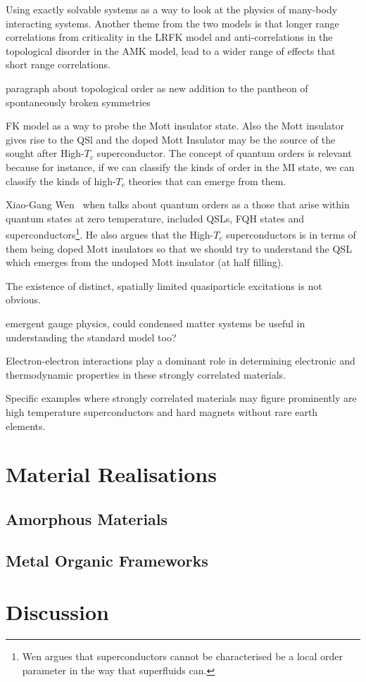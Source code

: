 Using exactly solvable systems as a way to look at the physics of many-body interacting systems. Another theme from the two models is that longer range correlations from criticality in the LRFK model and anti-correlations in the topological disorder in the AMK model, lead to a wider range of effects that short range correlations.

paragraph about topological order as new addition to the pantheon of spontaneously broken symmetries

FK model as a way to probe the Mott insulator state. Also the Mott insulator gives rise to the QSl and the doped Mott Insulator may be the source of the sought after High-\(T_c\) superconductor. The concept of quantum orders is relevant because for instance, if we can classify the kinds of order in the MI state, we can classify the kinds of high-\(T_c\) theories that can emerge from them.

Xiao-Gang Wen~\autocite{wenQuantumOrdersSymmetric2002} when talks about quantum orders as a those that arise within quantum states at zero temperature, included QSLs, FQH states and superconductors\footnote{Wen argues that superconductors cannot be characterised be a local order parameter in the way that superfluids can.}. He also argues that the High-\(T_c\) superconductors is in terms of them being doped Mott insulators so that we should try to understand the QSL which emerges from the undoped Mott insulator (at half filling).

The existence of distinct, spatially limited quasiparticle excitations is not obvious.

emergent gauge physics, could condensed matter systems be useful in understanding the standard model too?

Electron-electron interactions play a dominant role in determining electronic and thermodynamic properties in these strongly correlated materials.

Specific examples where strongly correlated materials may figure prominently are high temperature superconductors and hard magnets without rare earth elements.

\hypertarget{material-realisations}{%
\section{Material Realisations}\label{material-realisations}}

\hypertarget{amorphous-materials}{%
\subsection{Amorphous Materials}\label{amorphous-materials}}

\hypertarget{metal-organic-frameworks}{%
\subsection{Metal Organic Frameworks}\label{metal-organic-frameworks}}

\hypertarget{discussion}{%
\section{Discussion}\label{discussion}}
